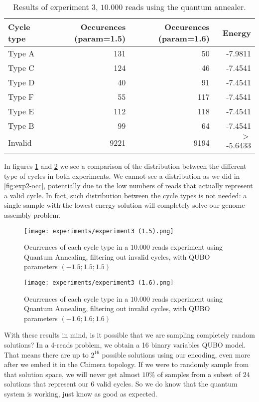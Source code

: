 \begin{table}[H]
	\centering
	\begin{tabular}{lrrr}
		\textbf{Cycle type} & \textbf{Occurences (param=1.5)} & \textbf{Occurences (param=1.6)} & \textbf{Energy} \\
		\hline
		Type A	& 131	& 50	& -7.9811	\\
		Type C	& 124	& 46	& -7.4541	\\
		Type D	& 40	& 91	& -7.4541	\\
		Type F	& 55	& 117	& -7.4541	\\
		Type E	& 112	& 118	& -7.4541	\\
		Type B	& 99	& 64	& -7.4541	\\    
		Invalid & 9221	& 9194	& $>$ -5.6433                         
	\end{tabular}
	\caption{Results of experiment 3, $10.000$ reads using the quantum annealer.}
	\label{tab:exp3}
\end{table}

In figures \ref{fig:exp3-occ1} and \ref{fig:exp3-occ2} we see a comparison of the distribution between the different type of cycles in both experiments. We cannot see a distribution as we did in \ref{fig:exp2-occ}, potentially due to the low numbers of reads that actually represent a valid cycle. In fact, such distribution between the cycle types is not needed: a single sample with the lowest energy solution will completely solve our genome assembly problem.

\begin{figure}[H]
	\texttt{[image: experiments/experiment3 (1.5).png]}
	\centering
	\caption{Ocurrences of each cycle type in a $10.000$ reads experiment using Quantum Annealing, filtering out invalid cycles, with QUBO parameters $(-1.5; 1.5; 1.5)$}
	\label{fig:exp3-occ1}
\end{figure}

\begin{figure}[H]
	\texttt{[image: experiments/experiment3 (1.6).png]}
	\centering
	\caption{Ocurrences of each cycle type in a $10.000$ reads experiment using Quantum Annealing, filtering out invalid cycles, with QUBO parameters $(-1.6; 1.6; 1.6)$}
	\label{fig:exp3-occ2}
\end{figure}

With these results in mind, is it possible that we are sampling completely random solutions? In a 4-reads problem, we obtain a 16 binary variables QUBO model. That means there are up to $2^{16}$ possible solutions using our encoding, even more after we embed it in the Chimera topology. If we were to randomly sample from that solution space, we will never get almost $10\%$ of samples from a subset of $24$ solutions that represent our $6$ valid cycles. So we do know that the quantum system is working, just know as good as expected.

